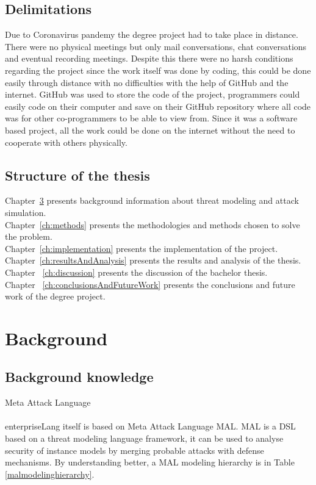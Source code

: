 \documentclass[english]{kththesis}
\begin{document}
\section{Delimitations}%
\noindent Due to Coronavirus pandemy the degree project had to take place in distance. There were no physical meetings but only mail conversations, chat conversations and eventual  recording meetings. Despite this there were no harsh conditions regarding the project since the work itself was done by coding, this could be done easily through distance with no difficulties with the help of GitHub and the internet. GitHub was used to store the code of the project, programmers could easily code on their computer and save on their GitHub repository where all code was for other co-programmers to be able to view from. Since it was a software based project, all the work could be done on the internet without the need to cooperate with others physically.

\section{Structure of the thesis}
\noindent Chapter~\ref{ch:background} presents background information about threat modeling and attack simulation.  \\Chapter~\ref{ch:methods} presents the methodologies and methods chosen to solve the problem.    \\Chapter~\ref{ch:implementation} presents the implementation of the project.  \\Chapter~\ref{ch:resultsAndAnalysis} presents the results and analysis of the thesis. \\Chapter ~\ref{ch:discussion} presents the discussion of the bachelor thesis.  \\Chapter ~\ref{ch:conclusionsAndFutureWork} presents the conclusions and future work of the degree project.


\cleardoublepage
\chapter{Background}
\label{ch:background}

\section{Background knowledge}

{\Large Meta Attack Language}
\\\\
\noindent enterpriseLang itself is based on Meta Attack Language \gls{MAL}. \gls{MAL} is a \gls{DSL} based on a threat modeling language framework, it can be used to analyse security of instance models by merging probable attacks with defense mechanisms. By understanding better, a \gls{MAL} modeling hierarchy is in Table \ref{malmodelinghierarchy}\cite{xiong2021cyber}.\\\\
\end{document}
